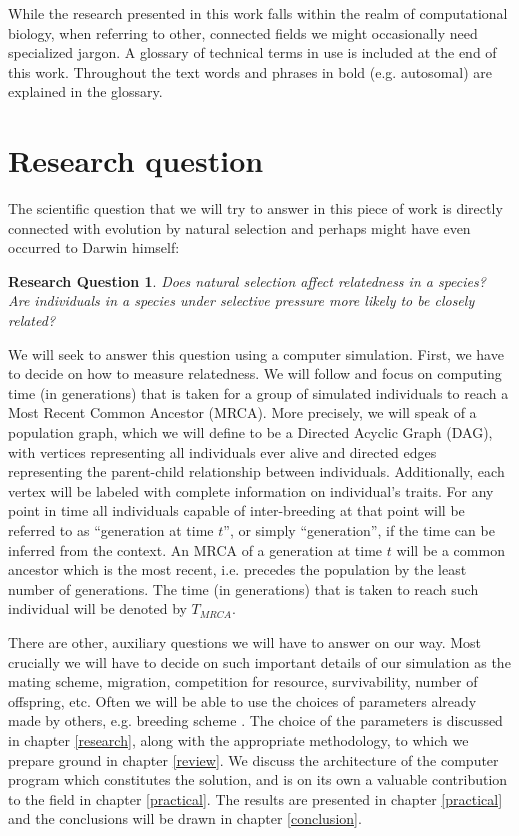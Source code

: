 \documentclass{l4proj}
\newtheorem*{quest}{Research Question}
\begin{document}
While the research presented in this work falls within the realm of computational biology, when referring to other, connected fields we might occasionally need specialized jargon. A glossary of technical terms in use is included at the end of this work. Throughout the text words and phrases in bold (e.g. \gls{autosomal}) are explained in the glossary.

\section{Research question}\label{TMRCA}
The scientific question that we will try to answer in this piece of work is directly connected with evolution by natural selection and perhaps might have even occurred to Darwin himself:

\begin{quest}
Does natural selection affect relatedness in a species? Are individuals in a species under selective pressure more likely to be closely related?
\end{quest}

We will seek to answer this question using a computer simulation. First, we have to decide on how to measure relatedness. We will follow \cite{rohde04} and focus on computing time (in generations) that is taken for a group of simulated individuals to reach a Most Recent Common Ancestor (MRCA). More precisely, we will speak of a \gls{population graph}, which we will define to be a Directed Acyclic Graph (DAG), with vertices representing all individuals ever alive and directed edges representing the parent-child relationship between individuals. Additionally, each vertex will be labeled with complete information on individual's traits. For any point in time all individuals capable of inter-breeding at that point will be referred to as ``generation at time $t$'', or simply ``generation'', if the time can be inferred from the context. An MRCA of a generation at time $t$ will be a common ancestor which is the most recent, i.e. precedes the population by the least number of generations. The time (in generations) that is taken to reach such individual will be denoted by $T_{MRCA}$.

There are other, auxiliary questions we will have to answer on our way. Most crucially we will have to decide on such important details of our simulation as the mating scheme, migration, competition for resource, survivability, number of offspring, etc. Often we will be able to use the choices of parameters already made by others, e.g. breeding scheme \parencite{peng10}. The choice of the parameters is discussed in chapter \ref{research}, along with the appropriate methodology, to which we prepare ground in chapter \ref{review}. We discuss the architecture of the computer program which constitutes the solution, and is on its own a valuable contribution to the field in chapter \ref{practical}. The results are presented in chapter \ref{practical} and the conclusions will be drawn in chapter \ref{conclusion}.
\end{document}
